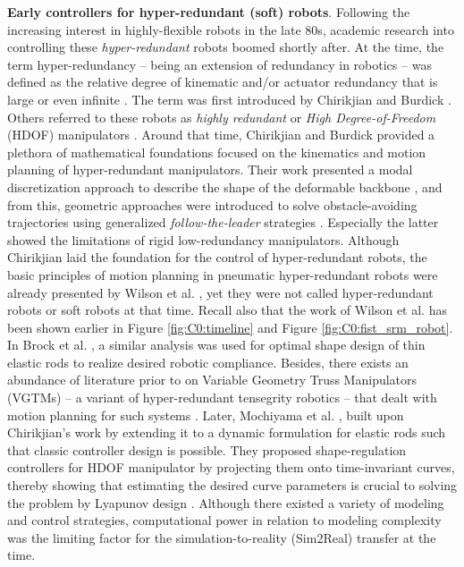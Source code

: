 \par \textbf{Early controllers for hyper-redundant (soft) robots}. Following the increasing interest in highly-flexible robots in the late 80s, academic research into controlling these \textit{hyper-redundant} robots boomed shortly after. At the time, the term hyper-redundancy -- being an extension of redundancy in robotics \cite{MerriamWebster1983} -- was defined as the relative degree of kinematic and/or actuator redundancy that is large or even infinite \cite{Chirikjian1992, Chirikjian1994}. The term was first introduced by Chirikjian and Burdick \cite{Chirikjian1989}. Others referred to these robots as \textit{highly redundant} \cite{Wilson1988Dec, Naccarato1989Dec} or \textit{High Degree-of-Freedom} (HDOF) manipulators \cite{Salerno1989Jan, Mochiyama1999}. Around that time, Chirikjian and Burdick provided a plethora of mathematical foundations \cite{Chirikjian1994, Chirikjian1994Jun, Chirikjian1991, Chirikjian1992, Chirikjian1992Dec} focused on the kinematics and motion planning of hyper-redundant manipulators. Their work presented a modal discretization approach to describe the shape of the deformable backbone \cite{Chirikjian1994Jun}, and from this, geometric approaches were introduced to solve obstacle-avoiding trajectories using generalized \textit{follow-the-leader} strategies \cite{Chirikjian1992Dec}. Especially the latter showed the limitations of rigid low-redundancy manipulators. Although Chirikjian laid the foundation for the control of hyper-redundant robots, the basic principles of motion planning in pneumatic hyper-redundant robots were already presented by Wilson et al. \cite{Wilson1988Dec, Wilson1989Jun}, yet they were not called hyper-redundant robots or soft robots at that time. Recall also that the work of Wilson et al. has been shown earlier in Figure \ref{fig:C0:timeline} and Figure \ref{fig:C0:fist_srm_robot}. In Brock et al. \cite{Brock1991}, a similar analysis was used for optimal shape design of thin elastic rods to realize desired robotic compliance. Besides, there exists an abundance of literature prior to \cite{Chirikjian1992} on Variable Geometry Truss Manipulators (VGTMs) -- a variant of hyper-redundant tensegrity robotics -- that dealt with motion planning for such systems \cite{Naccarato1989Dec, Naccarato1991Apr, Salerno1989Jan}. Later, Mochiyama et al. \cite{Mochiyama1998, Mochiyama1999}, built upon Chirikjian's work by extending it to a dynamic formulation for elastic rods such that classic controller design is possible. They proposed shape-regulation controllers for HDOF manipulator by projecting them onto time-invariant curves, thereby showing that estimating the desired curve parameters is crucial to solving the problem by Lyapunov design \cite{Mochiyama1998}. Although there existed a variety of modeling and control strategies, computational power in relation to modeling complexity was the limiting factor for the simulation-to-reality (Sim2Real) transfer at the time.
